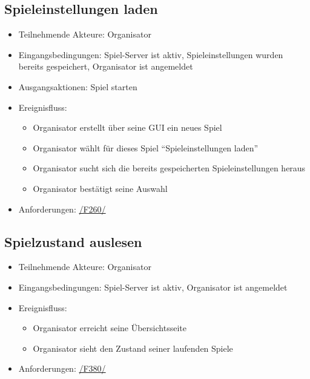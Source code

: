 \documentclass[a4paper]{scrreprt}
\begin{document}
    \subsection{Spieleinstellungen laden}
    \begin{itemize}
        \item Teilnehmende Akteure: \Gls{Organisator}
        \item Eingangsbedingungen: \Gls{Spiel-Server} ist aktiv, \Gls{Spieleinstellungen} wurden bereits gespeichert, \Gls{Organisator} ist angemeldet
        \item Ausgangsaktionen: \Gls{Spiel} starten
        \item Ereignisfluss:
        \begin{itemize}
            \item \Gls{Organisator} erstellt über seine GUI ein neues Spiel
            \item \Gls{Organisator} wählt für dieses \Gls{Spiel} \enquote{Spieleinstellungen laden}
            \item \Gls{Organisator} sucht sich die bereits gespeicherten \Gls{Spieleinstellungen} heraus
            \item \Gls{Organisator} bestätigt seine Auswahl
        \end{itemize}
        \item Anforderungen: \hyperlink{F260}{/F260/}
    \end{itemize}

 \subsection{Spielzustand auslesen}
	\begin{itemize}
		\item Teilnehmende Akteure: \Gls{Organisator}
		\item Eingangsbedingungen: \Gls{Spiel-Server} ist aktiv, \Gls{Organisator} ist angemeldet
		\item Ereignisfluss:
		\begin{itemize}
			\item \Gls{Organisator} erreicht seine Übersichtsseite
			\item \Gls{Organisator} sieht den Zustand seiner laufenden Spiele
		\end{itemize}
        \item Anforderungen: \hyperlink{F380}{/F380/}
	\end{itemize}
\end{document}
